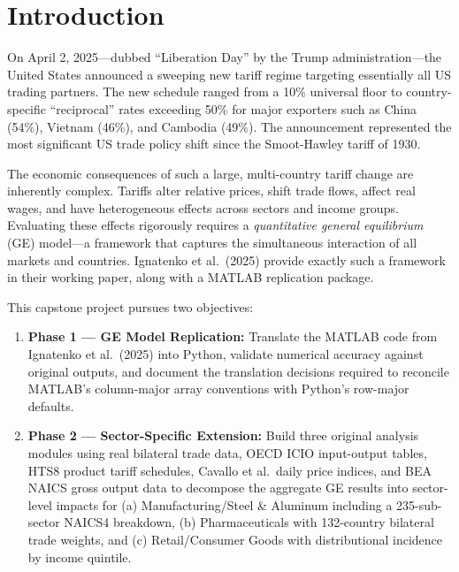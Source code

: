 \documentclass[12pt]{article}
\begin{document}
\newpage
\tableofcontents
\newpage

\section{Introduction}

On April 2, 2025---dubbed ``Liberation Day'' by the Trump
administration---the United States announced a sweeping new tariff regime
targeting essentially all US trading partners. The new schedule ranged from a
10\% universal floor to country-specific ``reciprocal'' rates exceeding 50\%
for major exporters such as China (54\%), Vietnam (46\%), and Cambodia (49\%).
The announcement represented the most significant US trade policy shift since
the Smoot-Hawley tariff of 1930.

The economic consequences of such a large, multi-country tariff change are
inherently complex. Tariffs alter relative prices, shift trade flows, affect real
wages, and have heterogeneous effects across sectors and income groups. Evaluating
these effects rigorously requires a \emph{quantitative general equilibrium} (GE)
model---a framework that captures the simultaneous interaction of all markets and
countries. Ignatenko et al.\ (2025) provide exactly such a framework in their
working paper, along with a MATLAB replication package.

This capstone project pursues two objectives:

\begin{enumerate}
    \item \textbf{Phase 1 --- GE Model Replication:} Translate the MATLAB code
    from Ignatenko et al.\ (2025) into Python, validate numerical accuracy
    against original outputs, and document the translation decisions required
    to reconcile MATLAB's column-major array conventions with Python's row-major
    defaults.

    \item \textbf{Phase 2 --- Sector-Specific Extension:} Build three original
    analysis modules using real bilateral trade data, OECD ICIO input-output
    tables, HTS8 product tariff schedules, Cavallo et al.\ daily price
    indices, and BEA NAICS gross output data to decompose the aggregate GE
    results into sector-level impacts for (a) Manufacturing/Steel \& Aluminum
    including a 235-sub-sector NAICS4 breakdown, (b) Pharmaceuticals with
    132-country bilateral trade weights, and (c) Retail/Consumer Goods with
    distributional incidence by income quintile.
\end{enumerate}
\end{document}
